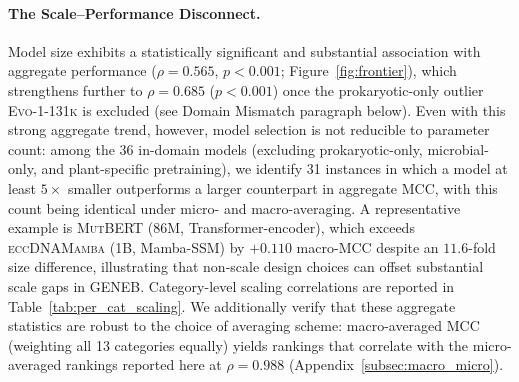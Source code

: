 \documentclass{article}
\theoremstyle{plain}
\theoremstyle{definition}
\theoremstyle{remark}
\begin{document}
\paragraph{The Scale--Performance Disconnect.}
Model size exhibits a statistically significant and substantial
association with aggregate performance ($\rho = 0.565$, $p < 0.001$;
Figure~\ref{fig:frontier}), which strengthens further to
$\rho = 0.685$ ($p < 0.001$) once the prokaryotic-only outlier
\textsc{Evo-1-131k} is excluded (see Domain Mismatch paragraph below).
Even with this strong aggregate trend, however, model selection is
not reducible to parameter count: among the 36 in-domain models
(excluding prokaryotic-only, microbial-only, and plant-specific
pretraining), we identify 31 instances in which a model at least
$5\times$ smaller outperforms a larger counterpart in aggregate MCC,
with this count being identical under micro- and macro-averaging.
A representative example is \textsc{MutBERT} (86M, Transformer-encoder),
which exceeds \textsc{eccDNAMamba} (1B, Mamba-SSM) by $+0.110$
macro-MCC despite an $11.6$-fold size difference, illustrating that
non-scale design choices can offset substantial scale gaps in GENEB.
Category-level scaling correlations are reported in
Table~\ref{tab:per_cat_scaling}. We additionally verify that these
aggregate statistics are robust to the choice of averaging scheme:
macro-averaged MCC (weighting all 13 categories equally) yields
rankings that correlate with the micro-averaged rankings reported
here at $\rho = 0.988$ (Appendix~\ref{subsec:macro_micro}).
\end{document}
